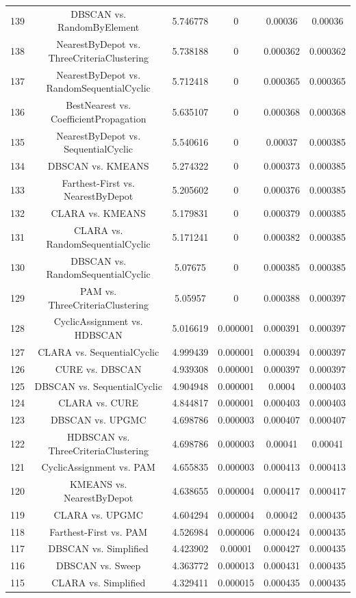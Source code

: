 \documentclass[a4paper,10pt]{article}
\begin{document}
\begin{landscape}
\begin{table}[!htp]
\begin{tabular}{cccccc}
139&DBSCAN vs. RandomByElement&5.746778&0&0.00036&0.00036\\
138&NearestByDepot vs. ThreeCriteriaClustering&5.738188&0&0.000362&0.000362\\
137&NearestByDepot vs. RandomSequentialCyclic&5.712418&0&0.000365&0.000365\\
136&BestNearest vs. CoefficientPropagation&5.635107&0&0.000368&0.000368\\
135&NearestByDepot vs. SequentialCyclic&5.540616&0&0.00037&0.000385\\
134&DBSCAN vs. KMEANS&5.274322&0&0.000373&0.000385\\
133&Farthest-First vs. NearestByDepot&5.205602&0&0.000376&0.000385\\
132&CLARA vs. KMEANS&5.179831&0&0.000379&0.000385\\
131&CLARA vs. RandomSequentialCyclic&5.171241&0&0.000382&0.000385\\
130&DBSCAN vs. RandomSequentialCyclic&5.07675&0&0.000385&0.000385\\
129&PAM vs. ThreeCriteriaClustering&5.05957&0&0.000388&0.000397\\
128&CyclicAssignment vs. HDBSCAN&5.016619&0.000001&0.000391&0.000397\\
127&CLARA vs. SequentialCyclic&4.999439&0.000001&0.000394&0.000397\\
126&CURE vs. DBSCAN&4.939308&0.000001&0.000397&0.000397\\
125&DBSCAN vs. SequentialCyclic&4.904948&0.000001&0.0004&0.000403\\
124&CLARA vs. CURE&4.844817&0.000001&0.000403&0.000403\\
123&DBSCAN vs. UPGMC&4.698786&0.000003&0.000407&0.000407\\
122&HDBSCAN vs. ThreeCriteriaClustering&4.698786&0.000003&0.00041&0.00041\\
121&CyclicAssignment vs. PAM&4.655835&0.000003&0.000413&0.000413\\
120&KMEANS vs. NearestByDepot&4.638655&0.000004&0.000417&0.000417\\
119&CLARA vs. UPGMC&4.604294&0.000004&0.00042&0.000435\\
118&Farthest-First vs. PAM&4.526984&0.000006&0.000424&0.000435\\
117&DBSCAN vs. Simplified&4.423902&0.00001&0.000427&0.000435\\
116&DBSCAN vs. Sweep&4.363772&0.000013&0.000431&0.000435\\
115&CLARA vs. Simplified&4.329411&0.000015&0.000435&0.000435\\

\end{tabular}
\end{table}
\end{landscape}
\end{document}
